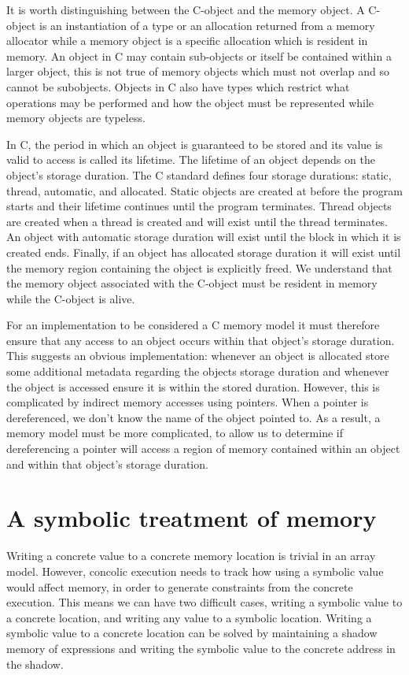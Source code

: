 \documentclass[12pt,twoside]{report}
\begin{document}
It is worth distinguishing between the C-object and the memory object. A C-object is an instantiation of a type or an allocation returned from a memory allocator while a memory object is a specific allocation which is resident in memory. An object in C may contain sub-objects or itself be contained within a larger object, this is not true of memory objects which must not overlap and so cannot be subobjects. Objects in C also have types which restrict what operations may be performed and how the object must be represented while memory objects are typeless.

In C, the period in which an object is guaranteed to be stored and its value is valid to access is called its lifetime. The lifetime of an object depends on the object's storage duration. The C standard defines four storage durations: static, thread, automatic, and allocated. Static objects are created at before the program starts and their lifetime continues until the program terminates. Thread objects are created when a thread is created and will exist until the thread terminates. An object with automatic storage duration will exist until the block in which it is created ends. Finally, if an object has allocated storage duration it will exist until the memory region containing the object is explicitly freed. We understand that the memory object associated with the C-object must be resident in memory while the C-object is alive.

For an implementation to be considered a C memory model it must therefore ensure that any access to an object occurs within that object's storage duration. This suggests an obvious implementation: whenever an object is allocated store some additional metadata regarding the objects storage duration and whenever the object is accessed ensure it is within the stored duration. However, this is complicated by indirect memory accesses using pointers. When a pointer is dereferenced, we don't know the name of the object pointed to. As a result, a memory model must be more complicated, to allow us to determine if dereferencing a pointer will access a region of memory contained within an object and within that object's storage duration.

\section{A symbolic treatment of memory}
Writing a concrete value to a concrete memory location is trivial in an array model. However, concolic execution needs to track how using a symbolic value would affect memory, in order to generate constraints from the concrete execution. This means we can have two difficult cases, writing a symbolic value to a concrete location, and writing any value to a symbolic location. Writing a symbolic value to a concrete location can be solved by maintaining a shadow memory of expressions and writing the symbolic value to the concrete address in the shadow.
\end{document}
